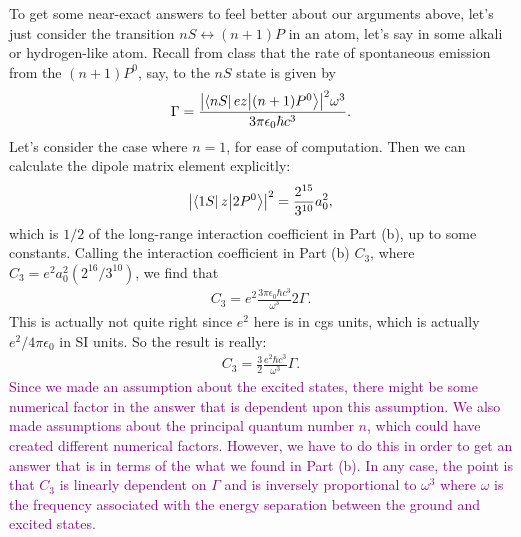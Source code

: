 \documentclass{article}
\theoremstyle{definition}
\newcommand{\f}[2]{\frac{#1}{#2}}
\begin{document}
\begin{enumerate}[label=(\alph*)]
To get some near-exact answers to feel better about our arguments above, let's just consider the transition $nS \leftrightarrow (n+1)P$ in an atom, let's say in some alkali or hydrogen-like atom. Recall from class that the rate of spontaneous emission from the $(n+1)P^0$, say, to the $nS$ state is given by 
\begin{align*}
\Gamma = \f{\abs{\bra{nS} e z {\ket{(n+1)P^0}}}^2 \omega^3}{ 3\pi \epsilon_0 \hbar c^3}. 
\end{align*}
Let's consider the case where $n=1$, for ease of computation. Then we can calculate the dipole matrix element explicitly:
\begin{align*}
\abs{\bra{1S} z {\ket{2P^0}}}^2 = \f{2^{15}}{3^{10}} a_0^2,
\end{align*}
which is $1/2$ of the long-range interaction coefficient in Part (b), up to some constants. Calling the interaction coefficient in Part (b) $C_3$, where $C_3 = e^2 a_0^2 (2^{16} / 3^{10})$, we find that
\begin{align*}
C_3 = e^2 \f{3\pi \epsilon_0 \hbar c^3 }{\omega^3} 2\Gamma.
\end{align*}
This is actually not quite right since $e^2$ here is in cgs units, which is actually $e^2/4\pi\epsilon_0$ in SI units. So the result is really:
\begin{align*}
C_3 = \f{3}{2}  \f{e^2 \hbar c^3}{\omega^3} \Gamma.
\end{align*}
\textcolor{purple}{Since we made an assumption about the excited states, there might be some numerical factor in the answer that is dependent upon this assumption. We also made assumptions about the principal quantum number $n$, which could have created different numerical factors. However, we have to do this in order to get an answer that is in terms of the what we found in Part (b). In any case, the point is that $C_3$ is linearly dependent on $\Gamma$ and is inversely proportional to $\omega^3$ where $\omega$ is the frequency associated with the energy separation between the ground and excited states. }


\end{enumerate}
\end{document}
